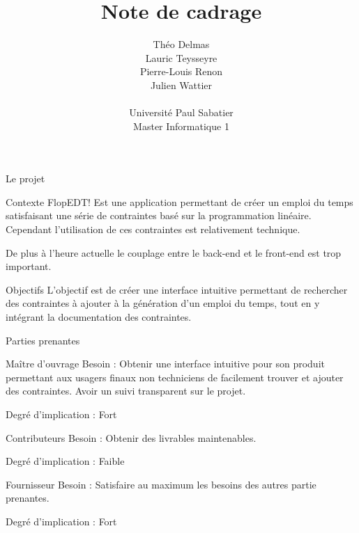 \documentclass[]{article}
\title{Note de cadrage}
\author{
    Théo Delmas\\
    Lauric Teysseyre\\
    Pierre-Louis Renon\\
    Julien Wattier\\
    \\
    Université Paul Sabatier\\
    Master Informatique 1\\
   }
\date{}
\begin{document}
    \maketitle
    \newpage
    \tableofcontents
    \newpage

    \begin{section}{Le projet}
        \begin{subsection}{Contexte}
            FlopEDT! Est une application permettant de créer un emploi du temps satisfaisant une série de contraintes basé sur 
            la programmation linéaire. Cependant l’utilisation de ces contraintes est relativement technique.

            De plus à l’heure actuelle le couplage entre le back-end et le front-end est trop important.
        \end{subsection}

        \begin{subsection}{Objectifs}
            L’objectif est de créer une interface intuitive permettant de rechercher des contraintes à ajouter à la génération 
            d’un emploi du temps, tout en y intégrant la documentation des contraintes.
        \end{subsection}

        \begin{subsection}{Parties prenantes}
            \begin{subsubsection}{Maître d'ouvrage}
                Besoin : Obtenir une interface intuitive pour son produit permettant aux usagers finaux non techniciens de 
                facilement trouver et ajouter des contraintes. Avoir un suivi transparent sur le projet. 

                Degré d’implication : Fort
            \end{subsubsection}

            \begin{subsubsection}{Contributeurs}
                Besoin : Obtenir des livrables maintenables.

                Degré d’implication : Faible
            \end{subsubsection}

            \begin{subsubsection}{Fournisseur}
                Besoin : Satisfaire au maximum les besoins des autres partie prenantes.

                Degré d’implication : Fort
            \end{subsubsection}


\end{subsection}
\end{section}
\end{document}
